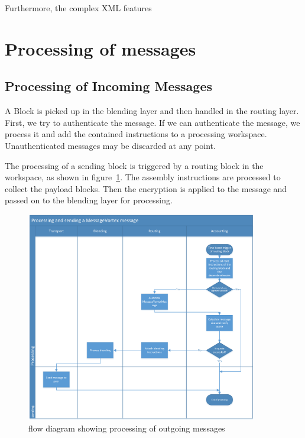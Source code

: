 Furthermore, the complex XML features 

\section{Processing of messages}

\subsection{Processing of Incoming Messages}\label{sec:processingIncommingMessages}
A Block is picked up in the blending layer and then handled in the routing layer. First, we try to authenticate the message. If we can authenticate the message, we process it and add the contained instructions to a processing workspace. Unauthenticated messages may be discarded at any point.

The processing of a sending block is triggered by a routing block in the workspace, as shown in figure~\ref{fig:msgSendProcessing}. The assembly instructions are processed to collect the payload blocks. Then the encryption is applied to the message and passed on to the blending layer for processing.

\begin{figure}[hbt]
	\includegraphics[width=0.90\textwidth]{inc/flowchart_message_sending}
	\caption{flow diagram showing processing of outgoing messages}
	\label{fig:msgSendProcessing}
\end{figure}


